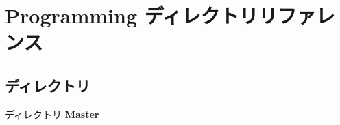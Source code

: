 \section{Programming ディレクトリリファレンス}
\label{dir_89d32e4e26b9b93c85c915e3b07e88b7}
\subsection*{ディレクトリ}
\begin{DoxyCompactItemize}
\item 
ディレクトリ {\bf Master}
\end{DoxyCompactItemize}
